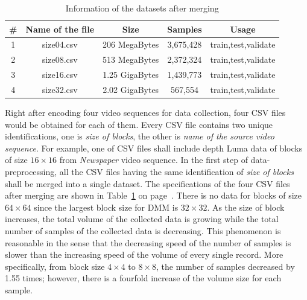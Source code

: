 \begin{table}[H]
    \caption{Information of the datasets after merging}
    \bigskip\label{tab:datasets-after-first-step}
    \centering
    \begin{tabular}{c c c c c}
        \toprule
        \# & Name of the file & Size & Samples & Usage\\
        \midrule
        1 & size04.csv & 206 MegaBytes & 3,675,428 & train,test,validate\\
        2 & size08.csv & 513 MegaBytes & 2,372,324 & train,test,validate\\
        3 & size16.csv & 1.25 GigaBytes & 1,439,773 & train,test,validate\\
        4 & size32.csv & 2.02 GigaBytes & 567,554 & train,test,validate\\
        \bottomrule
    \end{tabular}
\end{table}
Right after encoding four video sequences for data 
collection, four CSV files
would be obtained for each of them.
Every CSV file contains two unique identifications,
one is \emph{size of blocks}, the other is 
\emph{name of the source video sequence}.
For example, one of CSV files shall include depth 
Luma data of blocks of size \(16\times16\) from
\emph{Newspaper} video sequence.
In the first step of data-preprocessing, all
the CSV files having the same identification of 
\emph{size of blocks} shall be merged into a single dataset.
The specifications of the four CSV files after merging 
are shown in Table~\ref{tab:datasets-after-first-step}
on page~\pageref{tab:datasets-after-first-step}.
There is no data for blocks of size \(64\times64\)
since the largest block size for DMM is \(32\times32\).
As the size of block
increases, the total volume of the collected data is growing
while the total number of samples of the collected data is
decreasing.
This phenomenon is reasonable in the sense that
the decreasing speed of the number of samples is slower 
than the increasing speed of the volume of every single
record.
More specifically, from block size \(4\times4\) to \(8\times8\),
the number of samples decreased by 1.55 times; however,
there is a fourfold increase of the volume size for 
each sample.

